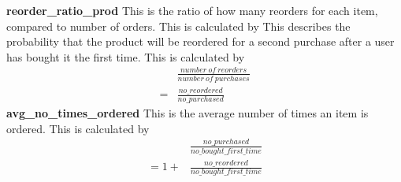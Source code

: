 \documentclass[12pt]{article}
\begin{document}
\newline\newline
{\textbf{reorder\_ratio\_prod}}
\newline
This is the ratio of how many reorders for each item, compared to number of orders. This is calculated by 
This describes the probability that the product will be reordered for a second purchase after a user has bought it the first time. This is calculated by
\begin{equation}
    \begin{split}
        &\frac
        {number\ of\ reorders}
        {number\ of\ purchases}\\
        = &\frac
        {no\_reordered}
        {no\_purchased}
    \end{split}
\end{equation}
\newline\newline
{\textbf{avg\_no\_times\_ordered}}
\newline
This is the average number of times an item is ordered. This is calculated by 
\begin{equation}
    \begin{split}
        &\frac
        {no\_purchased}
        {no\_bought\_first\_time}\\
        =1 + &\frac
        {no\_reordered}
        {no\_bought\_first\_time}
    \end{split}
\end{equation}
\end{document}
